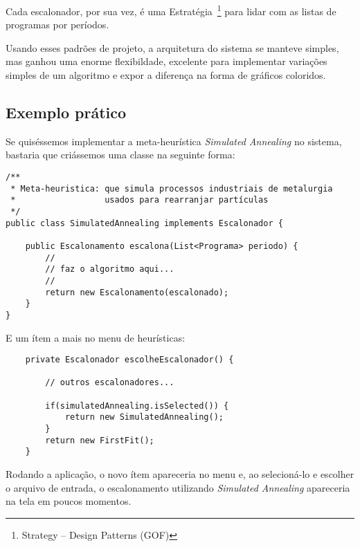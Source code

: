 Cada escalonador, por sua vez, é uma Estratégia~\footnote{Strategy -- Design Patterns (GOF)} para lidar com as listas de programas por períodos.

Usando esses padrões de projeto, a arquitetura do sistema se manteve simples, mas ganhou uma enorme flexibildade, excelente para implementar variações simples de um algoritmo e expor a diferença na forma de gráficos coloridos.

\subsection{Exemplo prático}

Se quiséssemos implementar a meta-heurística \textit{Simulated Annealing} no sistema, bastaria que criássemos uma classe na seguinte forma:

\vspace{1em}

\begin{lstlisting}
/**
 * Meta-heuristica: que simula processos industriais de metalurgia 
 * 					usados para rearranjar partículas
 */
public class SimulatedAnnealing implements Escalonador {

	public Escalonamento escalona(List<Programa> periodo) {
		//
		// faz o algoritmo aqui...
		//
		return new Escalonamento(escalonado);
	}
}
\end{lstlisting}

\vspace{1em}

E um ítem a mais no menu de heurísticas:

\vspace{1em}

\begin{lstlisting}
	private Escalonador escolheEscalonador() {

		// outros escalonadores...

		if(simulatedAnnealing.isSelected()) {
			return new SimulatedAnnealing();
		}
		return new FirstFit();
	}
\end{lstlisting}

Rodando a aplicação, o novo ítem apareceria no menu e, ao selecioná-lo e escolher o arquivo de entrada, o escalonamento utilizando \textit{Simulated Annealing} apareceria na tela em poucos momentos.
